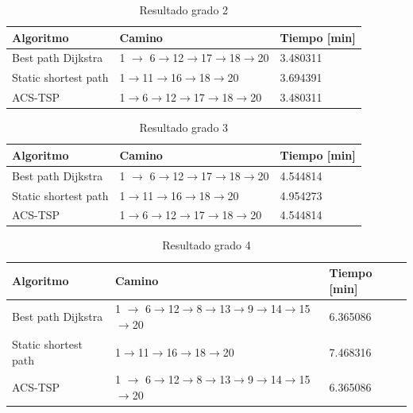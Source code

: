 \documentclass[letter, 10pt]{article}
\begin{document}
\begin{table}[H]
\centering
\begin{tabular}{|l|l|l|}
\hline
Algoritmo            & Camino           & Tiempo {[}min{]} \\ \hline
Best path Dijkstra   & 1 $\rightarrow$ 6$\rightarrow$12$\rightarrow$17$\rightarrow$18$\rightarrow$20 & 3.480311         \\ \hline
Static shortest path & 1$\rightarrow$11$\rightarrow$16$\rightarrow$18$\rightarrow$20    & 3.694391         \\ \hline
ACS-TSP              & 1$\rightarrow$6$\rightarrow$12$\rightarrow$17$\rightarrow$18$\rightarrow$20 & 3.480311         \\ \hline
\end{tabular}
\caption{Resultado grado 2}
\label{res-grade-2}
\end{table}

\begin{table}[H]
\centering
\begin{tabular}{|l|l|l|}
\hline
Algoritmo            & Camino           & Tiempo {[}min{]} \\ \hline
Best path Dijkstra   & 1 $\rightarrow$ 6$\rightarrow$12$\rightarrow$17$\rightarrow$18$\rightarrow$20 & 4.544814         \\ \hline
Static shortest path & 1$\rightarrow$11$\rightarrow$16$\rightarrow$18$\rightarrow$20    & 4.954273         \\ \hline
ACS-TSP              & 1$\rightarrow$6$\rightarrow$12$\rightarrow$17$\rightarrow$18$\rightarrow$20 & 4.544814         \\ \hline
\end{tabular}
\caption{Resultado grado 3}
\label{res-grade-3}
\end{table}


\begin{table}[H]
\centering
\begin{tabular}{|l|l|l|}
\hline
Algoritmo            & Camino           & Tiempo {[}min{]} \\ \hline
Best path Dijkstra   & 1 $\rightarrow$ 6$\rightarrow$12$\rightarrow$8$\rightarrow$13$\rightarrow$9$\rightarrow$14$\rightarrow$15$\rightarrow$20& 6.365086         \\ \hline
Static shortest path & 1$\rightarrow$11$\rightarrow$16$\rightarrow$18$\rightarrow$20    & 7.468316         \\ \hline
ACS-TSP              & 1 $\rightarrow$ 6$\rightarrow$12$\rightarrow$8$\rightarrow$13$\rightarrow$9$\rightarrow$14$\rightarrow$15$\rightarrow$20& 6.365086        \\ \hline
\end{tabular}
\caption{Resultado grado 4}
\label{res-grade-4}
\end{table}
\end{document}
